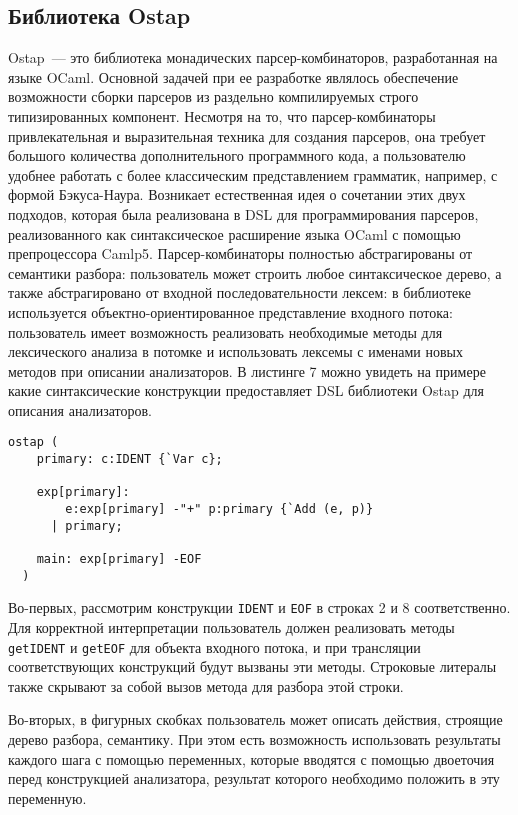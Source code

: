 \subsection{Библиотека Ostap}

Ostap~--- это библиотека монадических парсер-комбинаторов, разработанная на языке OCaml. Основной задачей при ее разработке являлось обеспечение возможности сборки парсеров из раздельно компилируемых строго типизированных компонент. Несмотря на то, что парсер-комбинаторы привлекательная и выразительная техника для создания парсеров, она требует большого количества дополнительного программного кода, а пользователю удобнее работать с более классическим представлением грамматик, например, с формой Бэкуса-Наура. Возникает естественная идея о сочетании этих двух подходов, которая была реализована в DSL для программирования парсеров, реализованного как синтаксическое расширение языка OCaml с помощью препроцессора Camlp5. Парсер-комбинаторы полностью абстрагированы от семантики разбора: пользователь может строить любое синтаксическое дерево, а также абстрагировано от входной последовательности лексем: в библиотеке используется объектно-ориентированное представление входного потока: пользователь имеет возможность реализовать необходимые методы для лексического анализа в потомке и использовать лексемы с именами новых методов при описании анализаторов. В листинге 7 можно увидеть на примере какие синтаксические конструкции предоставляет DSL библиотеки Ostap для описания анализаторов.

\begin{lstlisting}[basicstyle=\small, caption=Парсеры в синтаксисе Ostap]
  ostap (
    primary: c:IDENT {`Var c};

    exp[primary]:
        e:exp[primary] -"+" p:primary {`Add (e, p)}
      | primary;

    main: exp[primary] -EOF
  )
\end{lstlisting}

Во-первых, рассмотрим конструкции \lstinline|IDENT| и \lstinline|EOF| в строках 2 и 8 соответственно. Для корректной интерпретации пользователь должен реализовать методы \lstinline|getIDENT| и \lstinline|getEOF| для объекта входного потока, и при трансляции соответствующих конструкций будут вызваны эти методы. Строковые литералы также скрывают за собой вызов метода для разбора этой строки.

Во-вторых, в фигурных скобках пользователь может описать действия, строящие дерево разбора, семантику. При этом есть возможность использовать результаты каждого шага с помощью переменных, которые вводятся с помощью двоеточия перед конструкцией анализатора, результат которого необходимо положить в эту переменную.

